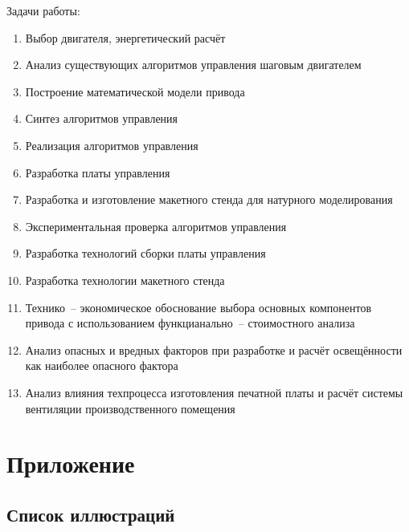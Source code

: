 \documentclass[a4paper, 14pt]{extarticle}
\begin{document}
\setcounter{page}{5}

\tableofcontents

\newpage


\newpage
Задачи работы:
\begin{enumerate}
    \item Выбор двигателя, энергетический расчёт
    \item Анализ существующих алгоритмов управления шаговым двигателем
    \item Построение математической модели привода
    \item Синтез алгоритмов управления
    \item Реализация алгоритмов управления
    \item Разработка платы управления
    \item Разработка и изготовление макетного стенда для натурного моделирования
    \item Экспериментальная проверка алгоритмов управления
    \item Разработка технологий сборки платы управления
    \item Разработка технологии макетного стенда
    \item Технико~-- экономическое обоснование выбора основных компонентов
        привода с использованием функцианально~-- стоимостного анализа
    \item Анализ опасных и вредных факторов при разработке и расчёт освещённости
        как наиболее опасного фактора
    \item Анализ влияния техпроцесса изготовления печатной платы и расчёт системы
        вентиляции производственного помещения
\end{enumerate}









\clearpage
\section{Приложение}
\subsection{Список иллюстраций}
\listoffigures
\clearpage
\end{document}
